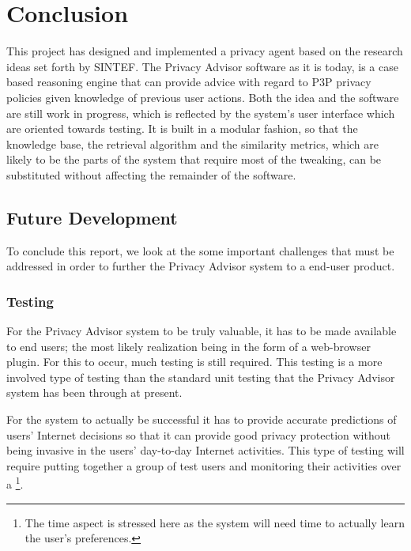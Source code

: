  

\chapter{Conclusion}\label{conclusion}

\minitoc

This project has designed and implemented a privacy agent based on the
research ideas set forth by SINTEF. The Privacy Advisor software as it
is today, is a case based reasoning engine that can provide advice
with regard to P3P privacy policies given knowledge of previous user
actions. Both the idea and the software are still work in progress,
which is reflected by the system's user interface which are oriented
towards testing. It is built in a modular fashion, so that the
knowledge base, the retrieval algorithm and the similarity metrics, which are likely to be the
parts of the system that require most of the tweaking, can
be substituted without affecting the remainder of the software.

\section{Future Development}

To conclude this report, we look at the some important challenges that
must be addressed in order to further the Privacy Advisor system to a
end-user product.

\subsection{Testing}
For the Privacy Advisor system to be truly valuable, it has to be made
available to end users; the most likely realization being in the
form of a web-browser plugin. For this to occur, much testing is still
required. This testing is a more involved type of testing than the standard
unit testing that the Privacy Advisor system has been through at present.

For the system to actually be successful it has to provide accurate predictions
of users' Internet decisions so that it can provide good privacy protection
without being invasive in the users' day-to-day Internet activities. This type
of testing will require putting together a group of test users and monitoring their
activities over a \footnote{The time aspect is stressed here
as the system will need time to actually learn the user's preferences.}. 

